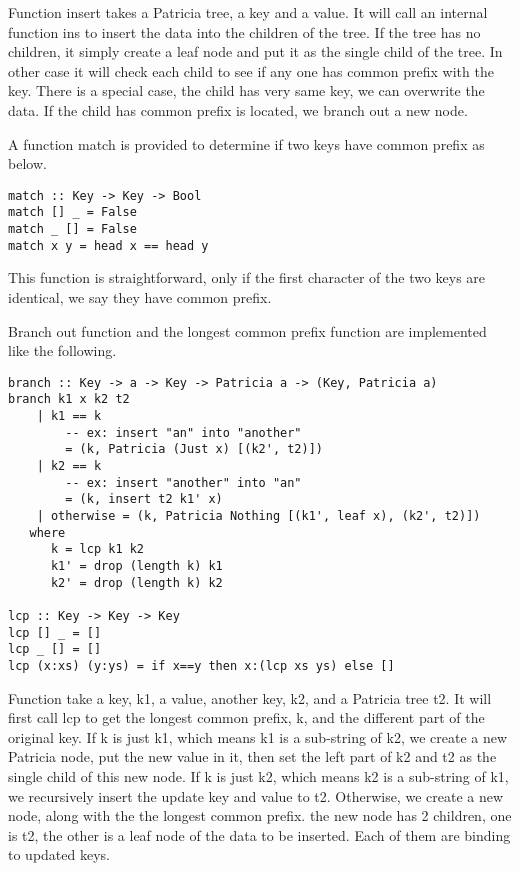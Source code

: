 \documentclass{article}
\begin{document}
Function insert takes a Patricia tree, a key and a value. It will call
an internal function ins to insert the data into the children of the tree.
If the tree has no children, it simply create a leaf node and put it
as the single child of the tree. In other case it will check each child
to see if any one has common prefix with the key. There is a special case,
the child has very same key, we can overwrite the data. If the child has common
prefix is located, we branch out a new node.

A function match is provided to determine if two keys have common prefix as
below.

\begin{lstlisting}
match :: Key -> Key -> Bool
match [] _ = False
match _ [] = False
match x y = head x == head y
\end{lstlisting}

This function is straightforward, only if the first character of the two keys
are identical, we say they have common prefix.

Branch out function and the longest common prefix function are implemented like
the following.

\begin{lstlisting}
branch :: Key -> a -> Key -> Patricia a -> (Key, Patricia a)
branch k1 x k2 t2
    | k1 == k
        -- ex: insert "an" into "another"
        = (k, Patricia (Just x) [(k2', t2)])
    | k2 == k
        -- ex: insert "another" into "an"
        = (k, insert t2 k1' x)
    | otherwise = (k, Patricia Nothing [(k1', leaf x), (k2', t2)])
   where
      k = lcp k1 k2
      k1' = drop (length k) k1
      k2' = drop (length k) k2

lcp :: Key -> Key -> Key
lcp [] _ = []
lcp _ [] = []
lcp (x:xs) (y:ys) = if x==y then x:(lcp xs ys) else []
\end{lstlisting}

Function take a key, k1, a value, another key, k2, and a Patricia tree t2. It will first
call lcp to get the longest common prefix, k, and the different part of the original key.
If k is just k1, which means k1 is a sub-string of k2, we create a new Patricia node,
put the new value in it, then set the left part of k2 and t2 as the single child of this
new node. If k is just k2, which means k2 is a sub-string of k1, we recursively insert
the update key and value to t2. Otherwise, we create a new node, along with the the longest
common prefix. the new node has 2 children, one is t2, the other is a leaf node of the data
to be inserted. Each of them are binding to updated keys.
\end{document}
